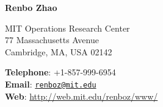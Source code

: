 \documentclass[11pt]{article}
\begin{document}
 
\begin{center}
\textbf{Renbo Zhao}\\
\end{center}

\begin{minipage}[t]{0.5\textwidth}
MIT Operations Research Center\\
77 Massachusetts Avenue\\
Cambridge, MA, USA 02142
\end{minipage}
\hspace{.5cm}
\begin{minipage}[t]{0.5\textwidth}
\textbf{Telephone}: +1-857-999-6954\\
\textbf{Email}: \href{mailto:}{\tt renboz@mit.edu}\\
\textbf{Web}: \url{http://web.mit.edu/renboz/www/}
\end{minipage} \newline\newline

\end{document}
